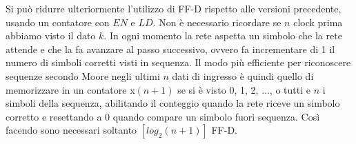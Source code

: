 \documentclass{article}
\begin{document}
Si può ridurre ulteriormente l'utilizzo di FF-D rispetto alle versioni precedente, usando un contatore con $EN$ e $LD$.
Non è necessario ricordare se $n$ clock prima abbiamo visto il dato $k$.
In ogni momento la rete aspetta un simbolo che la rete attende e che la fa avanzare al passo successivo, ovvero fa incrementare di 1 il numero di simboli corretti visti in sequenza.
Il modo più efficiente per riconoscere sequenze secondo Moore negli ultimi $n$ dati di ingresso è quindi quello di memorizzare in un contatore x$(n+1)$ se si è visto 0, 1, 2, $\dots$, o tutti e $n$ i simboli della sequenza, abilitando il conteggio quando la rete riceve un simbolo corretto e resettando a 0 quando compare un simbolo fuori sequenza.
Così facendo sono necessari soltanto $[log_2 (n+1)]$ FF-D.
\end{document}
